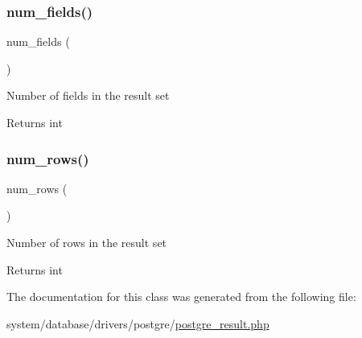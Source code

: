 \subsubsection{\texorpdfstring{num\+\_\+fields()}{num\_fields()}}
{\footnotesize\ttfamily num\+\_\+fields (\begin{DoxyParamCaption}{ }\end{DoxyParamCaption})}

Number of fields in the result set

\begin{DoxyReturn}{Returns}
int 
\end{DoxyReturn}
\mbox{\label{class_c_i___d_b__postgre__result_a218657c303ee499b97710ab0cd2f5d6e}} 
\subsubsection{\texorpdfstring{num\+\_\+rows()}{num\_rows()}}
{\footnotesize\ttfamily num\+\_\+rows (\begin{DoxyParamCaption}{ }\end{DoxyParamCaption})}

Number of rows in the result set

\begin{DoxyReturn}{Returns}
int 
\end{DoxyReturn}


The documentation for this class was generated from the following file\+:\begin{DoxyCompactItemize}
\item 
system/database/drivers/postgre/\mbox{\hyperlink{postgre__result_8php}{postgre\+\_\+result.\+php}}\end{DoxyCompactItemize}
